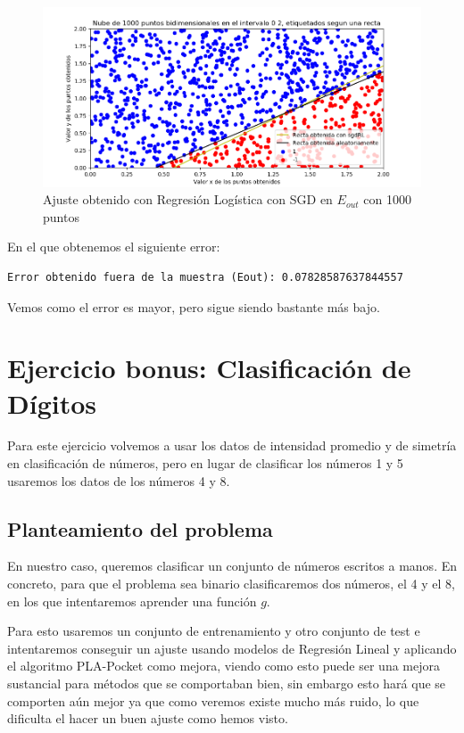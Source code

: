 \documentclass[12pt, spanish]{article}
\begin{document}
\begin{figure}[H]
  \centering
      \includegraphics[scale = 0.70]{ej-2-SGR-RL-1000.png}
 		 \caption{Ajuste obtenido con Regresión Logística con SGD en $E_{out}$ con 1000 puntos}
  		\label{fig:ej2-SGR-RL}

\end{figure}

En el que obtenemos el siguiente error:

\begin{lstlisting}
Error obtenido fuera de la muestra (Eout): 0.07828587637844557
\end{lstlisting}

Vemos como el error es mayor, pero sigue siendo bastante más bajo.



\section{Ejercicio bonus: Clasificación de Dígitos}

Para este ejercicio volvemos a usar los datos de intensidad promedio y de simetría en clasificación de números, pero en lugar de clasificar los números 1 y 5 usaremos los datos de los números 4 y 8.

\subsection{Planteamiento del problema}

En nuestro caso, queremos clasificar un conjunto de números escritos a manos. En concreto, para que el problema sea binario clasificaremos dos números, el 4 y el 8, en los que intentaremos aprender una función  $g$.

Para esto usaremos un conjunto de entrenamiento y otro conjunto de test e intentaremos conseguir un ajuste usando modelos de Regresión Lineal y aplicando el algoritmo PLA-Pocket como mejora, viendo como esto puede ser una mejora sustancial para métodos que se comportaban bien, sin embargo esto hará que se comporten aún mejor ya que como veremos existe mucho más ruido, lo que dificulta el hacer un buen ajuste como hemos visto.
\end{document}
